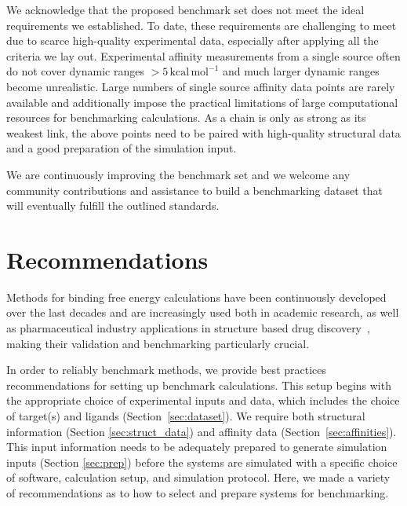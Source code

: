 \documentclass[9pt,bestpractices,pubversion]{livecoms}
\begin{document}
We acknowledge that the proposed benchmark set does not meet the ideal requirements we established. To date, these requirements are challenging to meet due to scarce high-quality experimental data, especially after applying all the criteria we lay out. Experimental affinity measurements from a single source often do not cover dynamic ranges $>5\,\mathrm{kcal\,mol^{-1}}$ and much larger dynamic ranges become unrealistic. Large numbers of single source affinity data points are rarely available and additionally impose the practical limitations of large computational resources for benchmarking calculations. As a chain is only as strong as its weakest link, the above points need to be paired with high-quality structural data and a good preparation of the simulation input. 

We are continuously improving the benchmark set and we welcome any community contributions and assistance to build a benchmarking dataset that will eventually fulfill the outlined standards.

\section{Recommendations}
\label{sec:recommendations}

Methods for binding free energy calculations have been continuously developed over the last decades and are increasingly used both in academic research, as well as pharmaceutical industry applications in structure based drug discovery~\cite{sherborne_collaborating_2016, gapsysLargeScaleRelative2020,schindler_largescale_2020}, making their validation and benchmarking particularly crucial. 
%

In order to reliably benchmark methods, we provide best practices recommendations for setting up benchmark calculations.
This setup begins with the appropriate choice of experimental inputs and data, which includes the choice of target(s) and ligands (Section~\ref{sec:dataset}). 
We require both
structural information (Section \ref{sec:struct_data}) and 
affinity data (Section~\ref{sec:affinities}).
This input information needs to be adequately prepared to generate simulation inputs (Section \ref{sec:prep}) before the systems are simulated with a specific choice of 
software, calculation setup, and simulation protocol. 
Here, we made a variety of recommendations as to how to select and prepare systems for benchmarking.
\end{document}
